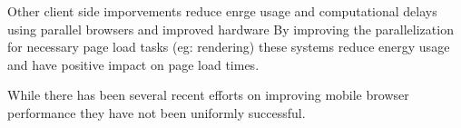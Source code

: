 Other client side imporvements reduce enrge usage and computational delays using parallel
browsers \cite{} %
and improved hardware \cite{} %
 By improving the parallelization 
for necessary page load tasks (eg: rendering) these systems reduce energy usage
and have positive impact on page load times. 

While there has been several recent efforts on improving mobile browser performance
they have not been uniformly successful.

